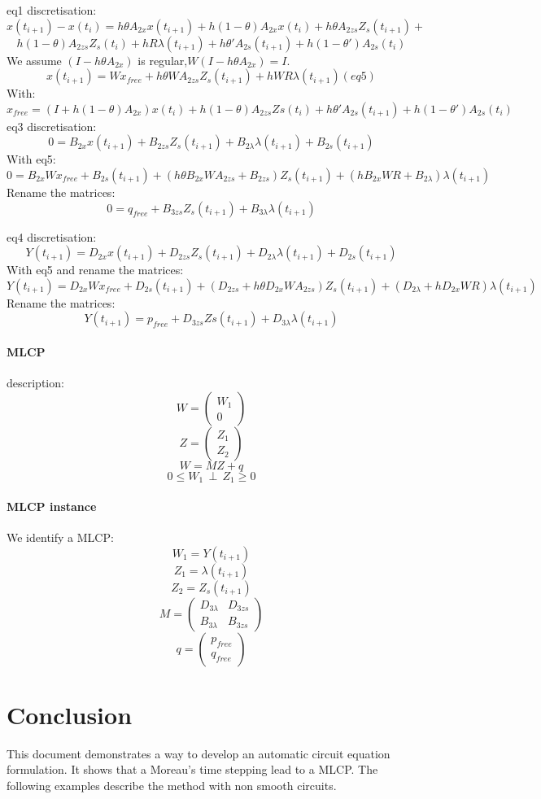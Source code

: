  eq1 discretisation:
\[x(t_{i+1}) - x(t_{i})=h\theta A_{2x}x(t_{i+1})+h(1-\theta)A_{2x}x(t_{i}) +h\theta
A_{2zs}Z_{s}(t_{i+1}) +\]
\[h(1-\theta)A_{2zs}Z_s(t_{i}) +hR\lambda (t_{i+1}) + h\theta 'A_{2s}(t_{i+1}) +
h(1-\theta ')A_{2s}(t_{i})\]
We assume $(I-h\theta A_{2x})$ is regular,$W(I-h\theta A_{2x}) = I.$
\[x(t_{i+1})=Wx_{free}+h\theta WA_{2zs}Z_{s}(t_{i+1})+hWR\lambda (t_{i+1})  (eq5)\]
With:
\[x_{free}=(I+h(1-\theta)A_{2x})x(t_{i}) + h(1-\theta )A_{2zs}Zs(t_{i}) + h\theta 'A_{2s}(t_{i+1}) +
h(1-\theta ')A_{2s}(t_{i})\]
eq3 discretisation:
\[0 = B_{2x}x(t_{i+1})+B_{2zs}Z_{s}(t_{i+1}) + B_{2\lambda}\lambda(t_{i+1})+B_{2s}(t_{i+1})\]
With eq5:
\[0 = B_{2x}Wx_{free}+B_{2s}(t_{i+1})+(h\theta B_{2x} WA_{2zs}+B_{2zs}) Z_{s}(t_{i+1})+(hB_{2x}WR+B_{2\lambda})\lambda(t_{i+1})\]
Rename the matrices:
\[0 = q_{free}+B_{3zs} Z_{s}(t_{i+1})+B_{3\lambda}\lambda(t_{i+1})\]

eq4 discretisation:
\[Y(t_{i+1})=D_{2x}x(t_{i+1})+D_{2zs}Z_{s}(t_{i+1}) +D_{2\lambda}\lambda(t_{i+1})+D_{2s}(t_{i+1})\]
With eq5 and rename the matrices:
\[Y(t_{i+1})=D_{2x}Wx_{free}+ D_{2s}(t_{i+1})+(D_{2zs}+h\theta
D_{2x}WA_{2zs})Z_{s}(t_{i+1})+(D_{2\lambda} + hD_{2x}WR)\lambda(t_{i+1})\]
Rename the matrices:
\[Y(t_{i+1})=p_{free}+D_{3zs}Zs(t_{i+1}) +D_{3\lambda}\lambda (t_{i+1})\]

\paragraph{MLCP}
description:\\

\[W=\left(\begin{array}{c}W_{1}\\0\end{array}\right)\]
\[Z=\left(\begin{array}{c}Z_{1}\\Z_{2}\end{array}\right)\]
\[W=MZ+q\]
\[0 \leq W_{1} \, \perp \, Z_{1} \geq 0\]
\paragraph{MLCP instance}
We identify a MLCP:\\
\[W_{1} = Y(t_{i+1})\]
\[Z_{1} = \lambda(t_{i+1})\]
\[Z_{2} = Z_{s}(t_{i+1})\]
\[M = \left(\begin{array}{cc}
  D_{3\lambda}&D_{3zs}\\
B_{3\lambda}&B_{3zs}
\end{array}\right)\]
\[q=\left(\begin{array}{c}
p_{free}\\
q_{free}\end{array}\right)\]
\section{Conclusion}
This document demonstrates a way to develop an automatic circuit equation formulation. It shows that a Moreau's time
stepping lead to a MLCP. The following examples describe the method with non smooth circuits.



